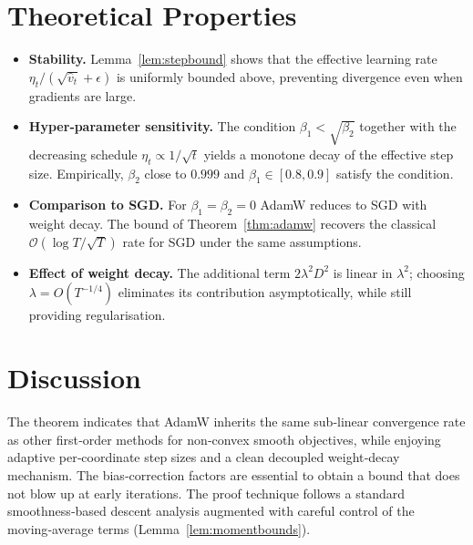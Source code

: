 \documentclass{article}
\begin{document}
\section*{Theoretical Properties}
\begin{itemize}
\item \textbf{Stability.} Lemma~\ref{lem:stepbound} shows that the effective learning rate $\eta_t/(\sqrt{\hat v_t}+\epsilon)$ is uniformly bounded above, preventing divergence even when gradients are large.
\item \textbf{Hyper‑parameter sensitivity.} The condition $\beta_1<\sqrt{\beta_2}$ together with the decreasing schedule $\eta_t\propto 1/\sqrt{t}$ yields a monotone decay of the effective step size. Empirically, $\beta_2$ close to $0.999$ and $\beta_1\in[0.8,0.9]$ satisfy the condition.
\item \textbf{Comparison to SGD.} For $\beta_1=\beta_2=0$ AdamW reduces to SGD with weight decay. The bound of Theorem~\ref{thm:adamw} recovers the classical $\mathcal{O}(\log T/\sqrt{T})$ rate for SGD under the same assumptions.
\item \textbf{Effect of weight decay.} The additional term $2\lambda^2 D^2$ is linear in $\lambda^2$; choosing $\lambda=O(T^{-1/4})$ eliminates its contribution asymptotically, while still providing regularisation.
\end{itemize}

\section*{Discussion}
The theorem indicates that AdamW inherits the same sub‑linear convergence rate as other first‑order methods for non‑convex smooth objectives, while enjoying adaptive per‑coordinate step sizes and a clean decoupled weight‑decay mechanism. The bias‑correction factors are essential to obtain a bound that does not blow up at early iterations. The proof technique follows a standard smoothness‑based descent analysis augmented with careful control of the moving‑average terms (Lemma~\ref{lem:momentbounds}).

\end{document}
